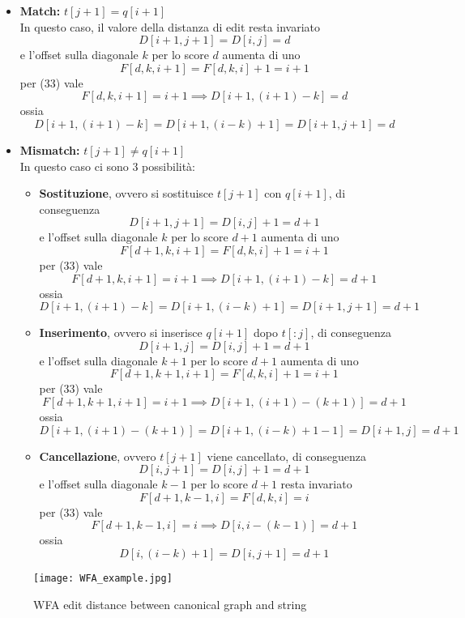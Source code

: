 \documentclass{article}
\begin{document}
\begin{itemize}
    \item \textbf{Match: } $t[j+1] = q[i+1]$ \\
    In questo caso, il valore della distanza di edit resta invariato 
    $$D[i+1, j+1] = D[i,j] = d$$
    e l'offset sulla diagonale $k$ per lo score $d$ aumenta di uno
    $$F[d, k, i + 1] = F[d, k, i] + 1 = i + 1$$
    per (33) vale
    $$F[d,k,i+1] = i + 1 \implies D[i+1, (i+1)-k] = d$$
    ossia
    $$D[i+1, (i+1)-k] = D[i+1, (i-k)+1] = D[i+1, j+1] = d$$
    
    \item \textbf{Mismatch: } $t[j+1] \neq q[i+1]$ \\ 
    In questo caso ci sono 3 possibilità:

    \begin{itemize}
        \item \textbf{Sostituzione}, ovvero si sostituisce $t[j+1]$ con $q[i+1]$, di conseguenza
        $$D[i+1, j+1] = D[i,j] + 1 = d + 1$$
        e l'offset sulla diagonale $k$ per lo score $d+1$ aumenta di uno
        $$F[d+1,k,i+1] = F[d,k,i] + 1 = i + 1$$
        per (33) vale
        $$F[d+1,k,i+1] = i + 1 \implies D[i+1, (i+1)-k] = d + 1$$
        ossia
        $$D[i+1, (i+1)-k] = D[i+1, (i-k)+1] = D[i+1, j+1] = d + 1$$

        \item \textbf{Inserimento}, ovvero si inserisce $q[i+1]$ dopo $t[:j]$, di conseguenza
        $$D[i+1,j] = D[i,j] + 1 = d + 1$$
         e l'offset sulla diagonale $k + 1$ per lo score $d+1$ aumenta di uno
        $$F[d+1,k+1,i+1] = F[d,k,i] + 1 = i + 1$$
        per (33) vale
        $$F[d+1,k+1,i+1] = i + 1 \implies D[i+1, (i+1)-(k+1)] = d + 1$$
        ossia
        $$D[i+1, (i+1)-(k+1)] = D[i+1, (i-k)+1-1] = D[i+1, j] = d + 1$$

        \item \textbf{Cancellazione}, ovvero $t[j+1]$ viene cancellato, di conseguenza
        $$D[i, j+1] = D[i,j] + 1 = d + 1$$
        e l'offset sulla diagonale $k - 1$ per lo score $d+1$ resta invariato
        $$F[d+1,k-1,i] = F[d,k,i] = i$$
        per (33) vale
        $$F[d+1,k-1,i] = i \implies D[i, i-(k-1)] = d + 1$$
        ossia
        $$D[i, (i-k)+1] = D[i, j+1] = d + 1$$
    \end{itemize}
\end{itemize}

\begin{figure}
    \centering
    \texttt{[image: WFA\_example.jpg]}
    \caption{WFA edit distance between canonical graph and string}
    \label{fig:Variation_graph_example}
\end{figure}
\end{document}
